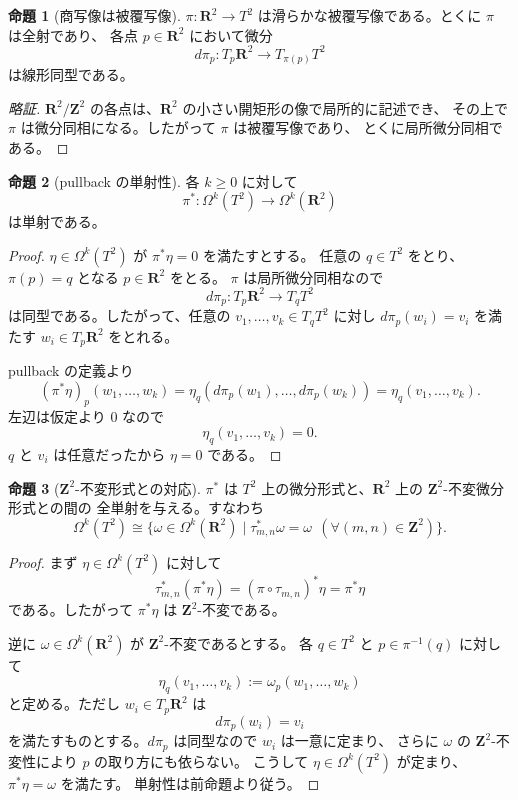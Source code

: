 \documentclass[uplatex,dvipdfmx,11pt]{jsarticle}
\newcommand{\R}{\mathbf{R}}
\newcommand{\Z}{\mathbf{Z}}
\theoremstyle{definition}
\newtheorem{prop}{命題}
\begin{document}
\begin{prop}[商写像は被覆写像]
\(\pi:\R^2\to T^2\) は滑らかな被覆写像である。とくに \(\pi\) は全射であり、
各点 \(p\in \R^2\) において微分
\[
d\pi_p:T_p\R^2\to T_{\pi(p)}T^2
\]
は線形同型である。
\end{prop}

\begin{proof}[略証]
\(\R^2/\Z^2\) の各点は、\(\R^2\) の小さい開矩形の像で局所的に記述でき、
その上で \(\pi\) は微分同相になる。したがって \(\pi\) は被覆写像であり、
とくに局所微分同相である。
\end{proof}

\begin{prop}[pullback の単射性]
各 \(k\ge 0\) に対して
\[
\pi^*:\Omega^k(T^2)\to \Omega^k(\R^2)
\]
は単射である。
\end{prop}

\begin{proof}
\(\eta\in\Omega^k(T^2)\) が \(\pi^*\eta=0\) を満たすとする。
任意の \(q\in T^2\) をとり、\(\pi(p)=q\) となる \(p\in\R^2\) をとる。
\(\pi\) は局所微分同相なので
\[
d\pi_p:T_p\R^2\to T_qT^2
\]
は同型である。したがって、任意の \(v_1,\dots,v_k\in T_qT^2\) に対し
\(d\pi_p(w_i)=v_i\) を満たす \(w_i\in T_p\R^2\) をとれる。

pullback の定義より
\[
(\pi^*\eta)_p(w_1,\dots,w_k)
=
\eta_q(d\pi_p(w_1),\dots,d\pi_p(w_k))
=
\eta_q(v_1,\dots,v_k).
\]
左辺は仮定より \(0\) なので
\[
\eta_q(v_1,\dots,v_k)=0.
\]
\(q\) と \(v_i\) は任意だったから \(\eta=0\) である。
\end{proof}

\begin{prop}[\(\Z^2\)-不変形式との対応]
\(\pi^*\) は \(T^2\) 上の微分形式と、\(\R^2\) 上の \(\Z^2\)-不変微分形式との間の
全単射を与える。すなわち
\[
\Omega^k(T^2)
\cong
\{\omega\in \Omega^k(\R^2)\mid \tau_{m,n}^*\omega=\omega\ \ (\forall (m,n)\in\Z^2)\}.
\]
\end{prop}

\begin{proof}
まず \(\eta\in\Omega^k(T^2)\) に対して
\[
\tau_{m,n}^*(\pi^*\eta)
=
(\pi\circ\tau_{m,n})^*\eta
=
\pi^*\eta
\]
である。したがって \(\pi^*\eta\) は \(\Z^2\)-不変である。

逆に \(\omega\in\Omega^k(\R^2)\) が \(\Z^2\)-不変であるとする。
各 \(q\in T^2\) と \(p\in\pi^{-1}(q)\) に対して
\[
\eta_q(v_1,\dots,v_k)
:=
\omega_p(w_1,\dots,w_k)
\]
と定める。ただし \(w_i\in T_p\R^2\) は
\[
d\pi_p(w_i)=v_i
\]
を満たすものとする。\(d\pi_p\) は同型なので \(w_i\) は一意に定まり、
さらに \(\omega\) の \(\Z^2\)-不変性により \(p\) の取り方にも依らない。
こうして \(\eta\in\Omega^k(T^2)\) が定まり、\(\pi^*\eta=\omega\) を満たす。
単射性は前命題より従う。
\end{proof}
\end{document}
